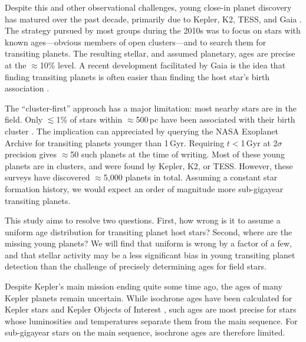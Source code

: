 \documentclass[11pt,twocolumn,tighten,linenumbers]{aastex63}
\begin{document}
Despite this and other observational challenges, young close-in planet
discovery has matured over the past decade, primarily due to Kepler,
K2, TESS, and Gaia
\citep[e.g.][]{Meibom_2013,Mann_K2_25_2016,Curtis_2018,Livingston_2018,David_2019,Bouma_2020_toi837,Rizzuto_2020,Plavchan_2020,Newton_2021,Nardiello_2022,Barber_2022,Zhou_2022,Zakhozhay_2022,Wood_2023}.
The strategy pursued by most groups during the 2010s was to focus on
stars with known ages---obvious members of open clusters---and to
search them for transiting planets.  The resulting stellar, and
assumed planetary, ages are precise at the $\approx$10\% level.  A
recent development facilitated by Gaia is the idea that finding
transiting planets is often easier than finding the host star's birth
association \citep[e.g.][]{Tofflemire_2021}.

The ``cluster-first'' approach has a major limitation: most nearby
stars are in the field.  Only $\lesssim$1\% of stars within
$\approx$500\,pc have been associated with their birth cluster
\citep[e.g.][]{Zari_2018,CantatGaudin_2020,Kounkel_2020,Kerr_2021}.
The implication can appreciated by querying the NASA Exoplanet Archive
\citep[NEA;][]{2013PASP..125..989A} for transiting planets younger
than 1\,Gyr.  Requiring $t$$<$1\,Gyr at 2$\sigma$ precision gives
$\approx$50 such planets at the time of writing.  Most of these young
planets are in clusters, and were found by Kepler, K2, or TESS.
However, these surveys have discovered $\approx$5{,}000 planets in
total.  Assuming a constant star formation history, we would expect an
order of magnitude more sub-gigayear transiting planets.

This study aims to resolve two questions.  First, how wrong is it to
assume a uniform age distribution for transiting planet host stars?
Second, where are the missing young planets?  We will find that
uniform is wrong by a factor of a few, and that stellar activity may
be a less significant bias in young transiting planet detection than
the challenge of precisely determining ages for field stars.

Despite Kepler's main mission ending quite some time ago, the ages of
many Kepler planets remain uncertain.  While isochrone ages have been
calculated for Kepler stars \citep{Berger_2020b_rpage} and Kepler
Objects of Interest \citep[KOIs;][]{Petigura_2022}, such ages are most
precise for stars whose luminosities and temperatures separate them
from the main sequence.  For sub-gigayear stars on the main sequence,
isochrone ages are therefore limited.
\end{document}
